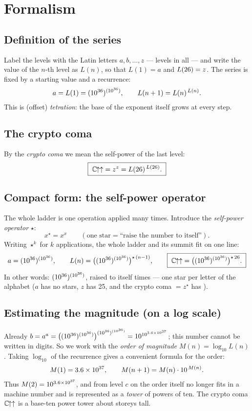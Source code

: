 \section{Formalism}

\subsection{Definition of the series}
Label the levels with the Latin letters \(a, b, \dots, z\) --- \nlevels{} levels in all ---
and write the value of the \(n\)-th level as \(L(n)\), so that \(L(1)=a\) and
\(L(26)=z\). The series is fixed by a starting value and a recurrence:
\[
  a = L(1) = (10^{36})^{(10^{36})}, \qquad L(n+1) = L(n)^{\,L(n)}.
\]
This is (offset) \emph{tetration}: the base of the exponent itself grows at every step.

\subsection{The crypto coma}
By the \emph{crypto coma} we mean the self-power of the last level:
\[
  \boxed{\;\mathbb{C}\mkern-1.5mu{\uparrow\uparrow} = z^{z} = L(26)^{\,L(26)}.\;}
\]

\subsection{Compact form: the self-power operator}
The whole ladder is one operation applied many times. Introduce the \emph{self-power
operator} \(\star\):
\[
  x^{\star} = x^{x} \qquad (\text{one star} = \text{``raise the number to itself''}).
\]
Writing \(\star^{k}\) for \(k\) applications, the whole ladder and its summit fit on one
line:
\[
  a = (10^{36})^{(10^{36})}, \qquad L(n) = \bigl((10^{36})^{(10^{36})}\bigr)^{\star\,(n-1)}, \qquad
  \boxed{\;\mathbb{C}\mkern-1.5mu{\uparrow\uparrow} = \bigl((10^{36})^{(10^{36})}\bigr)^{\star\,26}.\;}
\]
In other words: \((10^{36})^{(10^{36})}\), raised to itself \nlevels{} times --- one star per letter of
the alphabet (\(a\) has no stars, \(z\) has 25, and the crypto coma \(=z^{\star}\) has
\nlevels).

\subsection{Estimating the magnitude (on a log scale)}
Already \(b = a^{a} = \bigl((10^{36})^{(10^{36})}\bigr)^{(10^{36})^{(10^{36})}} = 10^{10^{3.6\times10^{37}}}\); this number cannot be
written in digits. So we work with the \emph{order of magnitude} \(M(n)=\log_{10}L(n)\).
Taking \(\log_{10}\) of the recurrence gives a convenient formula for the order:
\[
  M(1) = 3.6\times10^{37}, \qquad M(n+1) = M(n)\cdot 10^{\,M(n)}.
\]
Thus \(M(2) = 10^{3.6\times10^{37}}\), and from level \(c\) on the order itself no longer fits in a
machine number and is represented as a \emph{tower} of powers of ten. The crypto coma
\(\mathbb{C}\mkern-1.5mu{\uparrow\uparrow}\) is a base-ten power tower about \ccheight{} storeys tall.


